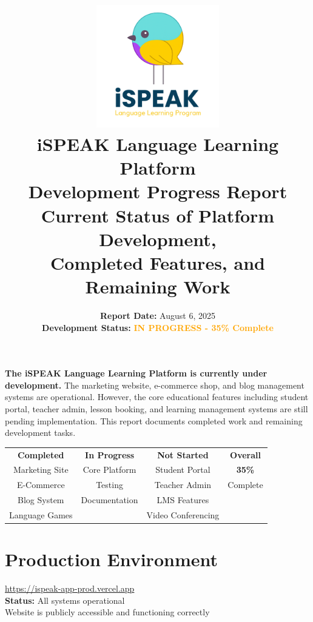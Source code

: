 \documentclass[11pt,a4paper]{article}
\title{
    \vspace{-2cm}
    \includegraphics[width=0.4\textwidth]{public/images/logos/ispeak-logo-with-text.png}\\
    \vspace{1cm}
    {\Huge\textbf{iSPEAK Language Learning Platform}}\\
    \vspace{0.5cm}
    {\Large\textbf{Development Progress Report}}\\
    \vspace{0.5cm}
    \large{Current Status of Platform Development,\\Completed Features, and Remaining Work}
}
\author{
    \textbf{Report Date:} August 6, 2025\\
    \textbf{Development Status:} \colorbox{yellow!30}{\textcolor{orange}{\textbf{IN PROGRESS - 35\% Complete}}}
}
\date{}
\begin{document}
\maketitle
\thispagestyle{empty}

\begin{tcolorbox}[colback=ispeak-purple!10, colframe=ispeak-purple, title=\textbf{EXECUTIVE SUMMARY}]
\textbf{The iSPEAK Language Learning Platform is currently under development.} The marketing website, e-commerce shop, and blog management systems are operational. However, the core educational features including student portal, teacher admin, lesson booking, and learning management systems are still pending implementation. This report documents completed work and remaining development tasks.
\end{tcolorbox}

\vspace{0.5cm}

\begin{center}
\begin{tabular}{|c|c|c|c|}
\hline
\rowcolor{header-bg!10}
\textbf{Completed} & \textbf{In Progress} & \textbf{Not Started} & \textbf{Overall} \\
Marketing Site & Core Platform & Student Portal & \textbf{35\%} \\
E-Commerce & Testing & Teacher Admin & Complete \\
Blog System & Documentation & LMS Features & \\
Language Games & & Video Conferencing & \\
\hline
\end{tabular}
\end{center}

\newpage

\tableofcontents
\newpage

\section{Production Environment}

\begin{tcolorbox}[colback=ispeak-teal!10, colframe=ispeak-teal, title=\textbf{Live Website URL}]
\centering
\Large{\url{https://ispeak-app-prod.vercel.app}}\\
\vspace{0.3cm}
\textbf{Status:} All systems operational\\
Website is publicly accessible and functioning correctly
\end{tcolorbox}
\end{document}

